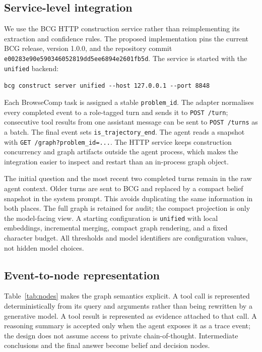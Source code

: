 \documentclass{article}
\begin{document}
\subsection{Service-level integration}

We use the BCG HTTP construction service rather than reimplementing its
extraction and confidence rules. The proposed implementation pins the current
BCG release, version 1.0.0, and the repository commit
\texttt{e00283e90e590346052819dd5ee6894e2601fb5d}. The service is started with
the \texttt{unified} backend:

\begin{center}
\small
\texttt{bcg construct server unified -{}-host 127.0.0.1 -{}-port 8848}
\end{center}

Each BrowseComp task is assigned a stable \texttt{problem\_id}. The adapter
normalises every completed event to a role-tagged turn and sends it to
\texttt{POST /turn}; consecutive tool results from one assistant message can be
sent to \texttt{POST /turns} as a batch. The final event sets
\texttt{is\_trajectory\_end}. The agent reads a snapshot with
\texttt{GET /graph?problem\_id=...}. The HTTP service keeps construction
concurrency and graph artifacts outside the agent process, which makes the
integration easier to inspect and restart than an in-process graph object.

The initial question and the most recent two completed turns remain in the raw
agent context. Older turns are sent to BCG and replaced by a compact belief
snapshot in the system prompt. This avoids duplicating the same information in
both places. The full graph is retained for audit; the compact projection is
only the model-facing view. A starting configuration is \texttt{unified} with
local embeddings, incremental merging, compact graph rendering, and a fixed
character budget. All thresholds and model identifiers are configuration
values, not hidden model choices.

\subsection{Event-to-node representation}

Table~\ref{tab:nodes} makes the graph semantics explicit. A tool call is
represented deterministically from its query and arguments rather than being
rewritten by a generative model. A tool result is represented as evidence
attached to that call. A reasoning summary is accepted only when the agent
exposes it as a trace event; the design does not assume access to private
chain-of-thought. Intermediate conclusions and the final answer become
belief and decision nodes.
\end{document}
